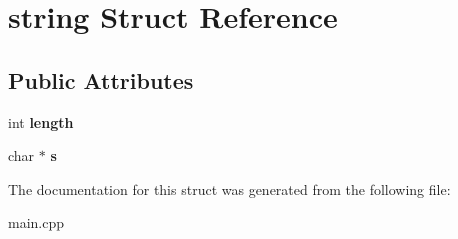 \hypertarget{structstring}{}\section{string Struct Reference}
\label{structstring}
\subsection*{Public Attributes}
\begin{DoxyCompactItemize}
\item 
\mbox{\label{structstring_a0f02d99781fc30085892c4df93698d43}} 
int {\bfseries length}
\item 
\mbox{\label{structstring_a2c5945adece53f2361cd7122952fde60}} 
char $\ast$ {\bfseries s}
\end{DoxyCompactItemize}


The documentation for this struct was generated from the following file\+:\begin{DoxyCompactItemize}
\item 
main.\+cpp\end{DoxyCompactItemize}
